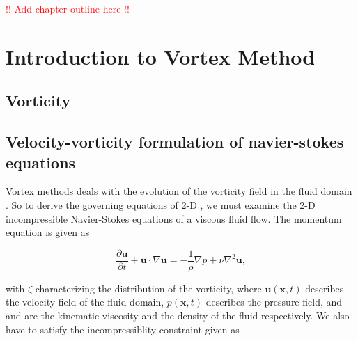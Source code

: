 \textcolor{red}{!! Add chapter outline here !!}

\section{Introduction to Vortex Method}

\subsection{Vorticity}

\subsection{Velocity-vorticity formulation of navier-stokes equations}

Vortex methods deals with the evolution of the vorticity field in the fluid domain \cite{Cottet2000a}. So to derive the governing equations of 2-D , we must examine the 2-D incompressible Navier-Stokes equations of a viscous fluid flow. The momentum equation is given as


\begin{equation}
\frac{\partial \mathbf{u}}{\partial t} + \mathbf{u}\cdot\nabla\mathbf{u} = - \frac{1}{\rho} \nabla p + \nu \nabla^2\mathbf{u},
\label{eq:mom}
\end{equation}

with $\zeta$ characterizing the distribution of the vorticity, where $\mathbf{u}\left(\mathbf{x},t\right)$  describes the velocity field of the fluid domain, $p\left(\mathbf{x},t\right)$  describes the pressure field, and  and  are the kinematic viscosity and the density of the fluid respectively. We also have to satisfy the incompressiblity constraint given as

